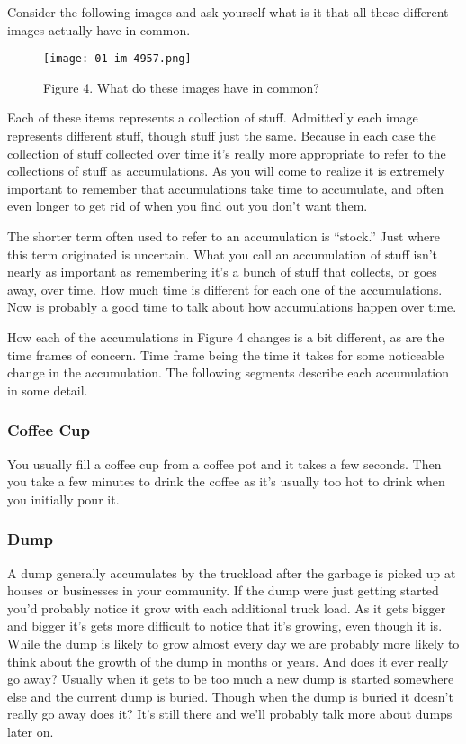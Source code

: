 \documentclass[]{memoir}
\let\Oldincludegraphics\includegraphics
\renewcommand{\includegraphics}[1]{\Oldincludegraphics[max size={\textwidth}{\textheight}]{#1}}
\begin{document}
Consider the following images and ask yourself what is it that all these
different images actually have in common.

\begin{figure}[htbp]
\centering
\texttt{[image: 01-im-4957.png]}
\caption{Figure 4. What do these images have in common?}
\end{figure}

Each of these items represents a collection of stuff. Admittedly each
image represents different stuff, though stuff just the same. Because in
each case the collection of stuff collected over time it's really more
appropriate to refer to the collections of stuff as accumulations. As
you will come to realize it is extremely important to remember that
accumulations take time to accumulate, and often even longer to get rid
of when you find out you don't want them.

The shorter term often used to refer to an accumulation is ``stock.''
Just where this term originated is uncertain. What you call an
accumulation of stuff isn't nearly as important as remembering it's a
bunch of stuff that collects, or goes away, over time. How much time is
different for each one of the accumulations. Now is probably a good time
to talk about how accumulations happen over time.

How each of the accumulations in Figure 4 changes is a bit different, as
are the time frames of concern. Time frame being the time it takes for
some noticeable change in the accumulation. The following segments
describe each accumulation in some detail.

\subsubsection{Coffee Cup}

You usually fill a coffee cup from a coffee pot and it takes a few
seconds. Then you take a few minutes to drink the coffee as it's usually
too hot to drink when you initially pour it.

\subsubsection{Dump}

A dump generally accumulates by the truckload after the garbage is
picked up at houses or businesses in your community. If the dump were
just getting started you'd probably notice it grow with each additional
truck load. As it gets bigger and bigger it's gets more difficult to
notice that it's growing, even though it is. While the dump is likely to
grow almost every day we are probably more likely to think about the
growth of the dump in months or years. And does it ever really go away?
Usually when it gets to be too much a new dump is started somewhere else
and the current dump is buried. Though when the dump is buried it
doesn't really go away does it? It's still there and we'll probably talk
more about dumps later on.
\end{document}
